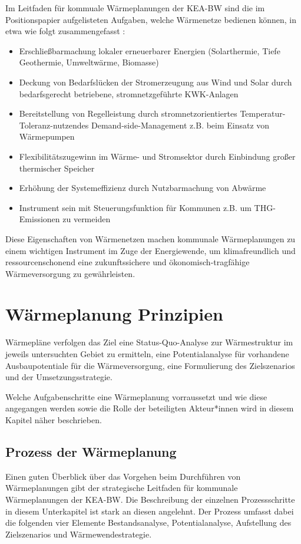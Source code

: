 			Im Leitfaden für kommuale Wärmeplanungen der KEA-BW sind die im Positionspapier aufgelisteten Aufgaben, welche Wärmenetze bedienen können, in etwa wie folgt zusammengefasst \cite[S.~18]{kea_bw_leitfaden_waermeplanung}:
			
			\begin{itemize}
				 \item{Erschließbarmachung lokaler erneuerbarer Energien (Solarthermie, Tiefe Geothermie, Umweltwärme, Biomasse)}
				 \item{Deckung von Bedarfslücken der Stromerzeugung aus Wind und Solar durch bedarfsgerecht betriebene, stromnetzgeführte KWK-Anlagen}
			 	\item{Bereitstellung von Regelleistung durch stromnetzorientiertes Temperatur-Toleranz-nutzendes Demand-side-Management z.B. beim Einsatz von Wärmepumpen}
				 \item{Flexibilitätszugewinn im Wärme- und Stromsektor durch Einbindung großer thermischer Speicher}
				 \item{Erhöhung der Systemeffizienz durch Nutzbarmachung von Abwärme}
				 \item{Instrument sein mit Steuerungsfunktion für Kommunen z.B. um THG-Emissionen zu vermeiden}
			\end{itemize}
		
			Diese Eigenschaften von Wärmenetzen machen kommunale Wärmeplanungen zu einem wichtigen Instrument im Zuge der Energiewende, um klimafreundlich und ressourcenschonend eine zukunftssichere und ökonomisch-tragfähige Wärmeversorgung zu gewährleisten.  
		
	\section{Wärmeplanung Prinzipien}
	\label{sec:Grundlagen:Wärmeplanung_Prinzipien}
			Wärmepläne verfolgen das Ziel eine Status-Quo-Analyse zur Wärmestruktur im jeweils untersuchten Gebiet zu ermitteln, eine Potentialanalyse für vorhandene Ausbaupotentiale für die Wärmeversorgung, eine Formulierung des Zielszenarios und der Umsetzungsstrategie. 
			
			Welche Aufgabenschritte eine Wärmeplanung vorraussetzt und wie diese angegangen werden sowie die Rolle der beteiligten Akteur*innen wird in diesem Kapitel näher beschrieben. 	
			
		\subsection{Prozess der Wärmeplanung}
			Einen guten Überblick über das Vorgehen beim Durchführen von Wärmeplanungen gibt der strategische Leitfaden für kommunale Wärmeplanungen der KEA-BW. Die Beschreibung der einzelnen Prozessschritte in diesem Unterkapitel ist stark an diesen angelehnt. Der Prozess umfasst dabei die folgenden vier Elemente Bestandsanalyse, Potentialanalyse, Aufstellung des Zielszenarios und Wärmewendestrategie. \cite{kea_bw_leitfaden_waermeplanung}
			
